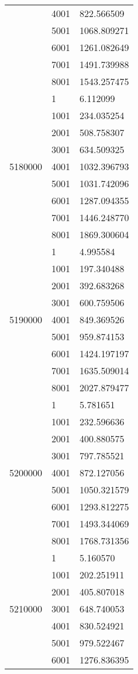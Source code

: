 \begin{table}[htb!]
\begin{tabular}{lll}
 & 4001 & 822.566509 \\
 & 5001 & 1068.809271 \\
 & 6001 & 1261.082649 \\
 & 7001 & 1491.739988 \\
 & 8001 & 1543.257475 \\
\multirow[c]{9}{*}{5180000} & 1 & 6.112099 \\
 & 1001 & 234.035254 \\
 & 2001 & 508.758307 \\
 & 3001 & 634.509325 \\
 & 4001 & 1032.396793 \\
 & 5001 & 1031.742096 \\
 & 6001 & 1287.094355 \\
 & 7001 & 1446.248770 \\
 & 8001 & 1869.300604 \\
\multirow[c]{9}{*}{5190000} & 1 & 4.995584 \\
 & 1001 & 197.340488 \\
 & 2001 & 392.683268 \\
 & 3001 & 600.759506 \\
 & 4001 & 849.369526 \\
 & 5001 & 959.874153 \\
 & 6001 & 1424.197197 \\
 & 7001 & 1635.509014 \\
 & 8001 & 2027.879477 \\
\multirow[c]{9}{*}{5200000} & 1 & 5.781651 \\
 & 1001 & 232.596636 \\
 & 2001 & 400.880575 \\
 & 3001 & 797.785521 \\
 & 4001 & 872.127056 \\
 & 5001 & 1050.321579 \\
 & 6001 & 1293.812275 \\
 & 7001 & 1493.344069 \\
 & 8001 & 1768.731356 \\
\multirow[c]{9}{*}{5210000} & 1 & 5.160570 \\
 & 1001 & 202.251911 \\
 & 2001 & 405.807018 \\
 & 3001 & 648.740053 \\
 & 4001 & 830.524921 \\
 & 5001 & 979.522467 \\
 & 6001 & 1276.836395 \\

\end{tabular}
\end{table}
